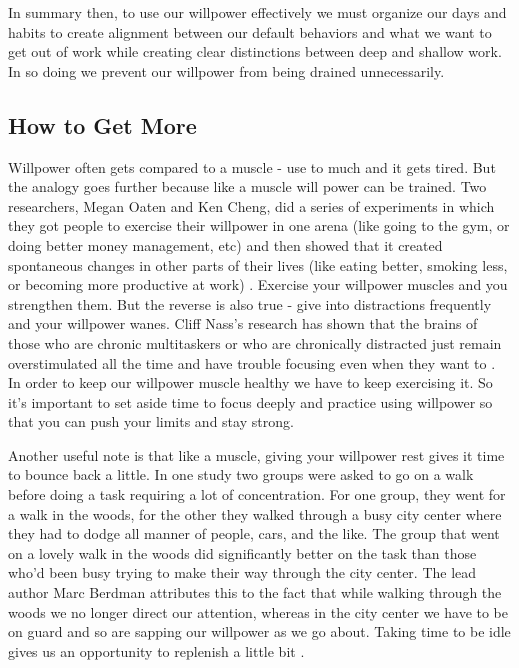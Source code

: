 \documentclass[11pt,a5paper]{book}
\begin{document}
In summary then, to use our willpower effectively we must organize our days and habits to create alignment between our default behaviors and what we want to get out of work while creating clear distinctions between deep and shallow work. In so doing we prevent our willpower from being drained unnecessarily. 

\subsection{How to Get More}
Willpower often gets compared to a muscle - use to much and it gets tired. But the analogy goes further because like a muscle will power can be trained. Two researchers, Megan Oaten and Ken Cheng, did a series of experiments in which they got people to exercise their willpower in one arena (like going to the gym, or doing better money management, etc) and then showed that it created spontaneous changes in other parts of their lives (like eating better, smoking less, or becoming more productive at work) \cite{duhigg}. Exercise your willpower muscles and you strengthen them. But the reverse is also true - give into distractions frequently and your willpower wanes. Cliff Nass's research has shown that the brains of those who are chronic multitaskers or who are chronically distracted just remain overstimulated all the time and have trouble focusing even when they want to \cite{newport}. In order to keep our willpower muscle healthy we have to keep exercising it. So it's important to set aside time to focus deeply and practice using willpower so that you can push your limits and stay strong.
\newline

Another useful note is that like a muscle, giving your willpower rest gives it time to bounce back a little. In one study two groups were asked to go on a walk before doing a task requiring a lot of concentration. For one group, they went for a walk in the woods, for the other they walked through a busy city center where they had to dodge all manner of people, cars, and the like. The group that went on a lovely walk in the woods did significantly better on the task than those who'd been busy trying to make their way through the city center. The lead author Marc Berdman attributes this to the fact that while walking through the woods we no longer direct our attention, whereas in the city center we have to be on guard and so are sapping our willpower as we go about. Taking time to be idle gives us an opportunity to replenish a little bit \cite{newport}.
\newline
\end{document}
